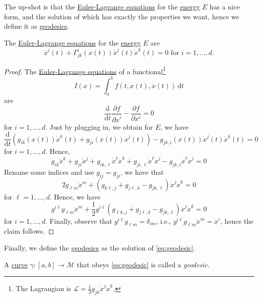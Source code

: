 The up-shot is that the \href{https://en.wikipedia.org/wiki/Euler%E2%80%93Lagrange_equation}{Euler-Lagrange equations} for the \hyperref[def:energy]{energy} \(E\) has a nice form, and the solution of which has exactly the properties we want, hence we define it as \hyperref[def:geodesic]{geodesics}. 

\begin{proposition}\label{prop:Euler-Lagrange-eq-geodesic}
	The \href{https://en.wikipedia.org/wiki/Euler%E2%80%93Lagrange_equation}{Euler-Lagrange equations} for the \hyperref[def:energy]{energy} \(E\) are 
	\begin{equation}\label{eq:geodesic}
		\ddot{x}^i(t) + \Gamma ^{i}_{jk}(x(t)) \dot{x}^j(t)\dot{x}^k(t) = 0 \text{ for } i = 1, \ldots , d.
	\end{equation}
\end{proposition}
\begin{proof}
	The \href{https://en.wikipedia.org/wiki/Euler%E2%80%93Lagrange_equation}{Euler-Lagrange equations} of a functional\footnote{The Lagrangian is \(\mathcal{L} = \frac{1}{2} g_{jk} \dot{x}^j \dot{x} ^k\).} 
	\[
		I(x) = \int_{a}^{b} f(t, x(t), \dot{x}(t)) \,\mathrm{d}t
	\]
	are
	\[
		\frac{\mathrm{d}}{\mathrm{d}t} \frac{\partial f}{\partial \dot{x}^i} - \frac{\partial f}{\partial x^i} = 0
	\]
	for \(i = 1, \ldots , d\). Just by plugging in, we obtain for \(E\), we have
	\[
		\frac{\mathrm{d}}{\mathrm{d}t} \left( g_{ik} (x(t)) \dot{x}^k (t) + g_{ji}(x(t))\dot{x}^j(t) \right) - g_{jk, i}(x(t))\dot{x}^j(t)\dot{x}^k(t) = 0
	\]
	for \(i = 1, \ldots , d\). Hence,
	\[
		g_{ik} \ddot{x}^k + g_{ji}\ddot{x}^j + g_{ik, \ell }\dot{x}^{\ell }\dot{x}^k + g_{ji, \ell }\dot{x}^{\ell}\dot{x}^j - g_{jk, i} \dot{x}^{\ell } \dot{x}^j = 0
	\]
	Rename some indices and use \(g_{ij} = g_{ji} \), we have that
	\[
		2g_{\ell m}\ddot{x}^m + \left( g_{k \ell , j}+ g_{j \ell , k} - g_{jk, \ell} \right) \dot{x}^j \dot{x}^k = 0
	\]
	for \(\ell = 1, \ldots , d\). Hence, we have
	\[
		g^{i \ell }g_{\ell m}\ddot{x}^m + \frac{1}{2} g^{i \ell } \left( g_{\ell k, j} + g_{j \ell , k} - g_{jk, \ell } \right) \dot{x}^j \dot{x}^k = 0
	\]
	for \(i = 1, \ldots , d\). Finally, observe that \(g^{i \ell } g_{\ell m} = \delta _{im}\), i.e., \(g^{i \ell } g_{\ell m} \ddot{x}^m = \ddot{x}^i\), hence the claim follows.
\end{proof}

Finally, we define the \hyperref[def:geodesic]{geodesics} as the solution of \autoref{eq:geodesic}.

\begin{definition}[Geodesic]\label{def:geodesic}
	A \hyperref[def:curve]{curve} \(\gamma \colon [a, b] \to  \mathcal{M} \) that obeys \autoref{eq:geodesic} is called a \emph{geodesic}.
\end{definition}

